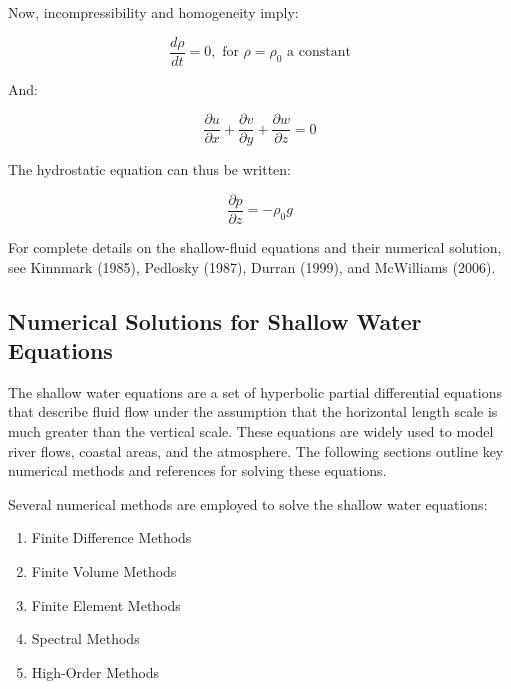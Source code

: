 \documentclass{article}
\begin{document}
Now,  incompressibility and homogeneity imply:

\begin{equation}
\frac{d\rho}{dt} = 0, \text{ for } \rho = \rho_0 \text{ a constant}
\label{eq:39}
\end{equation}

And:

\begin{equation}
\frac{\partial u}{\partial x} + \frac{\partial v}{\partial y} + \frac{\partial w}{\partial z} = 0
\label{eq:40}
\end{equation}

The hydrostatic equation can thus be written:

\begin{equation}
\frac{\partial p}{\partial z} = -\rho_0 g
\label{eq:41}
\end{equation}

For complete details on the shallow-fluid equations and their numerical solution, see Kinnmark (1985), Pedlosky (1987), Durran (1999), and McWilliams (2006).

\subsection{Numerical Solutions for Shallow Water Equations}
The shallow water equations are a set of hyperbolic partial differential equations that describe fluid flow under the assumption that the horizontal length scale is much greater than the vertical scale. These equations are widely used to model river flows, coastal areas, and the atmosphere. The following sections outline key numerical methods and references for solving these equations.

Several numerical methods are employed to solve the shallow water equations:

\begin{enumerate}
	\item Finite Difference Methods
	\item Finite Volume Methods
	\item Finite Element Methods
	\item Spectral Methods
	\item High-Order Methods
\end{enumerate}



\clearpage
\end{document}
